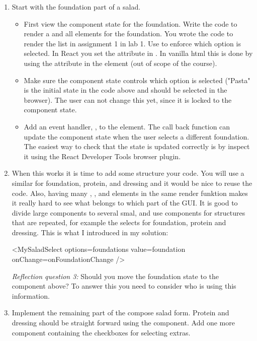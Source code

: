 \documentclass[fleqn, article, a4paper]{memoir}
\begin{document}
\begin{Assignments}
\begin{enumerate}
  \item Start with the foundation part of a salad. 
  \begin{itemize}
    \item First view the component state for the foundation. Write the code to render a  and all  elements for the foundation. You wrote the code to render the  list in assignment 1 in lab 1. Use  to enforce which option is selected. In React you set the  attribute in . In vanilla html this is done by using the  attribute in the  element (out of scope of the course).
    \item Make sure the component state controls which option is selected ("Pasta" is the initial state in the code above and should be selected in the browser). The user can not change this yet, since it is locked to the component state.
    \item Add an event handler, , to the  element. The call back function can update the component state when the user selects a different foundation. The easiest way to check that the state is updated correctly is by inspect it using the React Developer Tools browser plugin.
  \end{itemize}
  \item When this works it is time to add some structure your code. You will use a similar  for foundation, protein, and dressing and it would be nice to reuse the code. Also, having many , , and  elements in the same render funktion makes it really hard to see what belongs to which part of the GUI. It is good to divide large components to several smal, and use components for structures that are repeated, for example the selects for foundation, protein and dressing. This is what I introduced in my solution:
  \begin{Code}
  <MySaladSelect
      options={foundations}
      value={foundation}
      onChange={onFoundationChange}
  />
  \end{Code}
  \emph{Reflection question 3:} Should you move the foundation state to the  component above? To answer this you need to consider who is using this information.

\item Implement the remaining part of the compose salad form. Protein and dressing should be straight forward using the  component. Add one more component containing the checkboxes for selecting extras.


\end{enumerate}
\end{Assignments}
\end{document}
